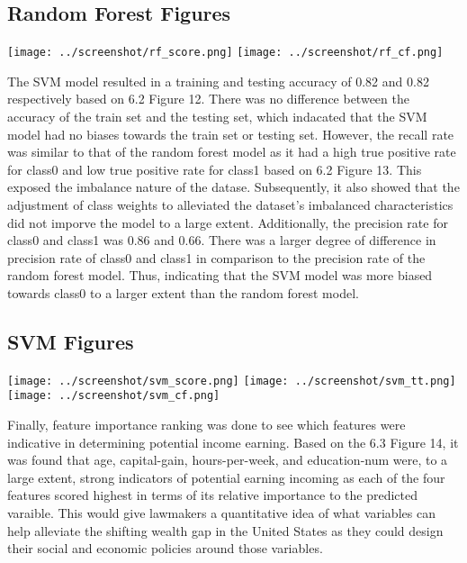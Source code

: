 \documentclass[12pt]{article}
\begin{document}
\begin{multicols*}{2}
  \subsection{Random Forest Figures}
  \begin{center}
	\texttt{[image: ../screenshot/rf\_score.png]}	
	\texttt{[image: ../screenshot/rf\_cf.png]}
  \end{center}
	
	\hspace*{5mm} The SVM model resulted in a training and testing accuracy of 0.82 and 0.82 respectively based on 6.2 Figure 12. There was no difference between the accuracy of the train set and the testing set, which indacated that the SVM
	model had no biases towards the train set or testing set. However, the recall rate was similar to that of the random forest model as it had a high true positive rate for class0 and low true positive rate for class1 based on 6.2 Figure 13. This exposed the imbalance nature of the datase. Subsequently,
	 it also showed that the adjustment of class weights to alleviated the dataset's imbalanced characteristics did not imporve the model to a large extent. Additionally, the precision rate for class0 and class1 was 0.86 and 0.66. There was a larger degree of difference in precision
	rate of class0 and class1 in comparison to the precision rate of the random forest model. Thus, indicating that the SVM model was more biased towards class0 to a larger extent than the random forest model.  

	\subsection{SVM Figures}
	\begin{center}
	\texttt{[image: ../screenshot/svm\_score.png]}
	\texttt{[image: ../screenshot/svm\_tt.png]}	
	\texttt{[image: ../screenshot/svm\_cf.png]}
	\end{center}


	\hspace*{5mm} Finally, feature importance ranking was done to see which features were indicative in determining potential income earning. Based on the 6.3 Figure 14, it was found that age, capital-gain, hours-per-week, and education-num were,
	to a large extent, strong indicators of potential earning incoming as each of the four features scored highest in terms of its relative importance to the predicted varaible. This would give lawmakers a quantitative idea of what variables
	can help alleviate the shifting wealth gap in the United States as they could design their social and economic policies around those variables. 

\end{multicols*}
\end{document}
